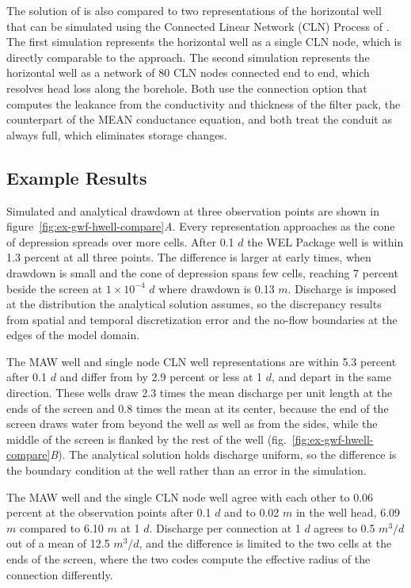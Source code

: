 The solution of \cite{zhan2001} is also compared to two representations of the horizontal well that can be simulated using the Connected Linear Network (CLN) Process of \mfu \citep{modflowusg}. The first \mfu simulation represents the horizontal well as a single CLN node, which is directly comparable to the \mf approach. The second \mfu simulation represents the horizontal well as a network of 80 CLN nodes connected end to end, which resolves head loss along the borehole. Both use the connection option that computes the leakance from the conductivity and thickness of the filter pack, the counterpart of the MEAN conductance equation, and both treat the conduit as always full, which eliminates storage changes.



\subsection{Example Results}

Simulated and analytical drawdown at three observation points are shown in figure~\ref{fig:ex-gwf-hwell-compare}\textit{A}. Every representation approaches \cite{zhan2001} as the cone of depression spreads over more cells. After 0.1 $d$ the WEL Package well is within 1.3 percent at all three points. The difference is larger at early times, when drawdown is small and the cone of depression spans few cells, reaching 7 percent beside the screen at $1 \times 10^{-4}$ $d$ where drawdown is 0.13 $m$. Discharge is imposed at the distribution the analytical solution assumes, so the discrepancy results from spatial and temporal discretization error and the no-flow boundaries at the edges of the model domain.

The \mf MAW well and single node \mfu CLN well representations are within 5.3 percent after 0.1 $d$ and differ from \cite{zhan2001} by 2.9 percent or less at 1 $d$, and depart in the same direction. These wells draw 2.3 times the mean discharge per unit length at the ends of the screen and 0.8 times the mean at its center, because the end of the screen draws water from beyond the well as well as from the sides, while the middle of the screen is flanked by the rest of the well (fig.~\ref{fig:ex-gwf-hwell-compare}\textit{B}). The analytical solution holds discharge uniform, so the difference is the boundary condition at the well rather than an error in the simulation.

The MAW well and the single CLN node well agree with each other to 0.06 percent at the observation points after 0.1 $d$ and to 0.02 $m$ in the well head, 6.09 $m$ compared to 6.10 $m$ at 1 $d$. Discharge per connection at 1 $d$ agrees to 0.5 $m^3/d$ out of a mean of 12.5 $m^3/d$, and the difference is limited to the two cells at the ends of the screen, where the two codes compute the effective radius of the connection differently.

